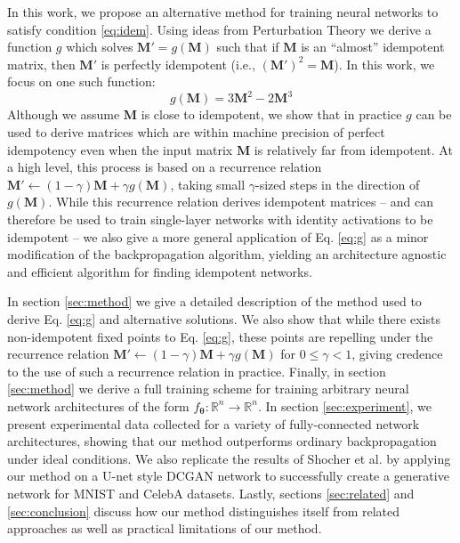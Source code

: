 \documentclass{article}
\newcommand{\vM}{\mathbf{M}}
\newcommand{\vtheta}{\bm{\theta}}
\begin{document}
In this work, we propose an alternative method for training neural networks to satisfy condition \ref{eq:idem}. Using ideas from Perturbation Theory we derive a function $g$ which solves $\vM' = g(\vM)$ such that if $\vM$ is an ``almost'' idempotent matrix, then $\vM'$ is perfectly idempotent (i.e., $(\vM')^2 = \vM$). In this work, we focus on one such function:
%
\begin{equation}
  g(\vM) = 3 \vM^2 - 2 \vM^3
  \label{eq:g}
\end{equation}
%
Although we assume $\vM$ is close to idempotent, we show that in practice $g$ can be used to derive matrices which are within machine precision of perfect idempotency even when the input matrix $\vM$ is relatively far from idempotent. At a high level, this process is based on a recurrence relation ${\vM' \leftarrow (1 - \gamma)\vM + \gamma g(\vM)}$, taking small $\gamma$-sized steps in the direction of $g(\vM)$. While this recurrence relation derives idempotent matrices -- and can therefore be used to train single-layer networks with identity activations to be idempotent -- we also give a more general application of Eq. \ref{eq:g} as a minor modification of the backpropagation algorithm, yielding an architecture agnostic and efficient algorithm for finding idempotent networks.

In section \ref{sec:method} we give a detailed description of the method used to derive Eq. \ref{eq:g} and alternative solutions. We also show that while there exists non-idempotent fixed points to Eq. \ref{eq:g}, these points are repelling under the recurrence relation ${\vM' \leftarrow (1 - \gamma)\vM + \gamma g(\vM)}$ for $0 \leq \gamma < 1$, giving credence to the use of such a recurrence relation in practice. Finally, in section \ref{sec:method} we derive a full training scheme for training arbitrary neural network architectures of the form $f_{\vtheta}: \mathbb{R}^n \to \mathbb{R}^n$. In section \ref{sec:experiment}, we present experimental data collected for a variety of fully-connected network architectures, showing that our method outperforms ordinary backpropagation under ideal conditions. We also replicate the results of Shocher et al. by applying our method on a U-net style DCGAN network to successfully create a generative network for MNIST and CelebA datasets. Lastly, sections \ref{sec:related} and \ref{sec:conclusion} discuss how our method distinguishes itself from related approaches as well as practical limitations of our method.
\end{document}

